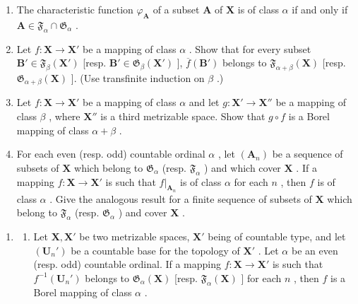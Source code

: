 \begin{enumerate}
\def\labelenumi{\alph{enumi})}
\item
  The characteristic function \(\varphi_{\mathbf{A}}\) of a subset \(\mathbf{A}\) of \(\mathbf{X}\) is of class \(\alpha\) if and only if \(\mathbf{A} \in \mathfrak{F}_{\alpha} \cap \mathfrak{G}_{\alpha}\) .
\item
  Let \(f: \mathbf{X} \to \mathbf{X}'\) be a mapping of class \(\alpha\) . Show that for every subset \(\mathbf{B}' \in \mathfrak{F}_{\beta}(\mathbf{X}')\) {[}resp. \(\mathbf{B}' \in \mathfrak{G}_{\beta}(\mathbf{X}')\) {]}, \(\overline{f}(\mathbf{B}')\) belongs to \(\mathfrak{F}_{\alpha + \beta}(\mathbf{X})\) {[}resp. \(\mathfrak{G}_{\alpha + \beta}(\mathbf{X})\) {]}. (Use transfinite induction on \(\beta\) .)
\item
  Let \(f: \mathbf{X} \to \mathbf{X}'\) be a mapping of class \(\alpha\) and let \(g: \mathbf{X}' \to \mathbf{X}''\) be a mapping of class \(\beta\) , where \(\mathbf{X}''\) is a third metrizable space. Show that \(g \circ f\) is a Borel mapping of class \(\alpha + \beta\) .
\item
  For each even (resp. odd) countable ordinal \(\alpha\) , let \((\mathbf{A}_n)\) be a sequence of subsets of \(\mathbf{X}\) which belong to \(\mathfrak{G}_{\alpha}\) (resp. \(\mathfrak{F}_{\alpha}\) ) and which cover \(\mathbf{X}\) . If a mapping \(f: \mathbf{X} \to \mathbf{X}'\) is such that \(f|_{\mathbf{A}_n}\) is of class \(\alpha\) for each \(n\) , then \(f\) is of class \(\alpha\) . Give the analogous result for a finite sequence of subsets of \(\mathbf{X}\) which belong to \(\mathfrak{F}_{\alpha}\) (resp. \(\mathfrak{G}_{\alpha}\) ) and cover \(\mathbf{X}\) .
\end{enumerate}

\begin{enumerate}
\def\labelenumi{\arabic{enumi})}
\setcounter{enumi}{16}
\tightlist
\item
  \begin{enumerate}
  \def\labelenumii{\alph{enumii})}
  \tightlist
  \item
    Let \(\mathbf{X}, \mathbf{X}'\) be two metrizable spaces, \(\mathbf{X}'\) being of countable type, and let \((\mathbf{U}_n')\) be a countable base for the topology of \(\mathbf{X}'\) . Let \(\alpha\) be an even (resp. odd) countable ordinal. If a mapping \(f: \mathbf{X} \to \mathbf{X}'\) is such that \(f^{-1}(\mathbf{U}_n')\) belongs to \(\mathfrak{G}_{\alpha}(\mathbf{X})\) {[}resp. \(\mathfrak{F}_{\alpha}(\mathbf{X})\) {]} for each \(n\) , then \(f\) is a Borel mapping of class \(\alpha\) .
  \end{enumerate}
\end{enumerate}

